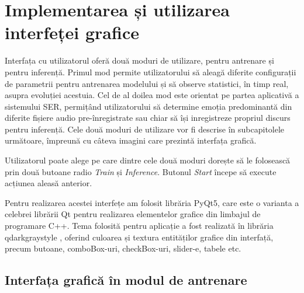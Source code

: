 \documentclass[a4paper,12pt]{book}
\begin{document}
	\section{Implementarea și utilizarea interfeței grafice}
		Interfața cu utilizatorul oferă două moduri de utilizare, pentru antrenare și pentru inferență. Primul mod permite utilizatorului să aleagă diferite configurații de parametrii pentru antrenarea modelului și să observe statistici, în timp real, asupra evoluției acestuia. Cel de al doilea mod este orientat pe partea aplicativă a sistemului SER, permițând utilizatorului să determine emoția predominantă din diferite fișiere audio pre-înregistrate sau chiar să își inregistreze propriul discurs pentru inferență. Cele două moduri de utilizare vor fi descrise în subcapitolele următoare, împreună cu câteva imagini care prezintă interfața grafică. \par 
		Utilizatorul poate alege pe care dintre cele două moduri dorește să le folosească prin două butoane radio \textit{Train} și \textit{Inference}. Butonul \textit{Start} începe să execute acțiunea aleasă anterior. \par
		
		Pentru realizarea acestei interfețe am folosit librăria PyQt5, care este o varianta a celebrei librării Qt pentru realizarea elementelor grafice din limbajul de programare C++. Tema folosită pentru aplicație a fost realizată în librăria qdarkgraystyle \cite{qdarkgraystyle}, oferind culoarea și textura entităților grafice din interfață, precum butoane, comboBox-uri, checkBox-uri, slider-e, tabele  etc. 
		
		\subsection{Interfața grafică în modul de antrenare} \label{guiAntrenare}
		
\end{document}
